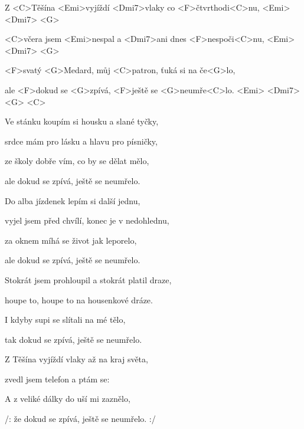 

\zs
Z <C>Těšína <Emi>vyjíždí <Dmi7>vlaky co <F>čtvrthodi<C>nu, <Emi> <Dmi7> <G>

<C>včera jsem <Emi>nespal a <Dmi7>ani dnes <F>nespoči<C>nu, <Emi> <Dmi7> <G>

<F>svatý <G>Medard, můj <C>patron, ťuká si na če<G>lo,

ale <F>dokud se <G>zpívá, <F>ještě se <G>neumře<C>lo. <Emi> <Dmi7> <G> <C>
\ks

\zs
Ve stánku koupím si housku a slané tyčky,

srdce mám pro lásku a hlavu pro písničky,

ze školy dobře vím, co by se dělat mělo,

ale dokud se zpívá, ještě se neumřelo.
\ks

\zs
Do alba jízdenek lepím si další jednu,

vyjel jsem před chvílí, konec je v nedohlednu,

za oknem míhá se život jak leporelo,

ale dokud se zpívá, ještě se neumřelo.
\ks

\zs
Stokrát jsem prohloupil a stokrát platil draze,

houpe to, houpe to na housenkové dráze.

I kdyby supi se slítali na mé tělo,

tak dokud se zpívá, ještě se neumřelo.
\ks

\zs
Z Těšína vyjíždí vlaky až na kraj světa,

zvedl jsem telefon a ptám se: 

A z veliké dálky do uší mi zaznělo,

/: že dokud se zpívá, ještě se neumřelo. :/
\ks

\kp
